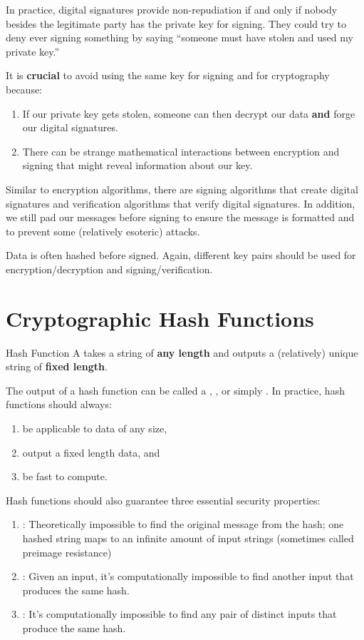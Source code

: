 In practice, digital signatures provide non-repudiation if and only if nobody besides the legitimate party has the private key for signing. They could try to deny ever signing something by saying ``someone must have stolen and used my private key.''

It is \textbf{crucial} to avoid using the same key for signing and for cryptography because:
\begin{enumerate}[noitemsep]
    \item If our private key gets stolen, someone can then decrypt our data \textbf{and} forge our digital signatures.
    \item There can be strange mathematical interactions between encryption and signing that might reveal information about our key.
\end{enumerate}

Similar to encryption algorithms, there are signing algorithms that create digital signatures and verification algorithms that verify digital signatures. In addition, we still pad our messages before signing to ensure the message is formatted and to prevent some (relatively esoteric) attacks.

Data is often hashed before signed. Again, different key pairs should be used for encryption/decryption and signing/verification.

\section{Cryptographic Hash Functions}

\begin{dfnbox}{Hash Function}{}
    A  takes a string of \textbf{any length} and outputs a (relatively) unique string of \textbf{fixed length}.
\end{dfnbox}

The output of a hash function can be called a , , or simply . In practice, hash functions should always:
\begin{enumerate}[noitemsep]
    \item be applicable to data of any size,
    \item output a fixed length data, and
    \item be fast to compute.
\end{enumerate}

Hash functions should also guarantee three essential security properties:
\begin{enumerate}[noitemsep]
    \item {}: Theoretically impossible to find the original message from the hash; one hashed string maps to an infinite amount of input strings (sometimes called preimage resistance)
    \item {}: Given an input, it's computationally impossible to find another input that produces the same hash.
    \item {}: It's computationally impossible to find any pair of distinct inputs that produce the same hash.
\end{enumerate}

